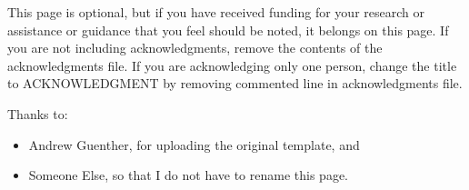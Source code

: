 
\begin{acknowledgments}

	This page is optional, but if you have received funding for your research or assistance or guidance that you feel should be noted, it belongs on this page. If you are not including acknowledgments, remove the contents of the acknowledgments file. If you are acknowledging only one person, change the title to ACKNOWLEDGMENT by removing commented line in acknowledgments file.

	Thanks to:
	\begin{itemize}
		\item Andrew Guenther, for uploading the original template, and
		\item Someone Else, so that I do not have to rename this page.
	\end{itemize}
\end{acknowledgments}
